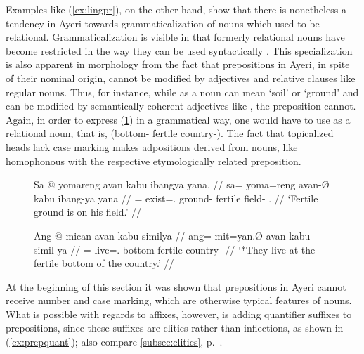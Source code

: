 Examples like (\ref{ex:lingpr}), on the other hand, show that there is
nonetheless a tendency in Ayeri towards grammaticalization of nouns which used
to be relational. Grammaticalization is visible in that formerly relational
nouns have become restricted in the way they can be used syntactically
\citep[174]{lehmann2015}. This specialization is also apparent in morphology
from the fact that prepositions in Ayeri, in spite of their nominal origin,
cannot be modified by adjectives and relative clauses like regular nouns. Thus,
for instance, while  as a noun can mean `soil' or `ground' and
can be modified by semantically coherent adjectives like
, the preposition  cannot. Again, in
order to express (\ref{ex:avanprep}) in a grammatical way, one would have to
use  as a relational noun, that is, 
(bottom-\Loc{} fertile country-\Gen{}). The fact that topicalized heads lack
case marking makes adpositions derived from nouns, like 
homophonous with the respective etymologically related preposition.

\begin{figure}[h]
\pex
\a\label{ex:avannn}\begingl
	\gla Sa @ yomareng avan kabu ibangya yana. //
	\glb sa= yoma=reng avan-Ø kabu ibang-ya yana //
	\glc \PatT{}= exist=\TsgI.\AargI{} ground-\Top{} fertile field-\Loc{} 
		\TsgM{}.\Gen{} //
	\glft `Fertile ground is on his field.' //
\endgl

\a\label{ex:avanprep}\ljudge* \begingl
	\gla Ang @ mican avan kabu similya //
	\glb ang= mit=yan.Ø avan kabu simil-ya //
	\glc \AgtT{}= live=\TplM{}.\Top{} bottom fertile country-\Loc{} //
	\glft `*They live at the fertile bottom of the country.' //
\endgl
\xe
\end{figure}

At the beginning of this section it was shown that prepositions in Ayeri cannot
receive number and case marking, which are otherwise typical features of nouns.
What is possible with regards to affixes, however, is adding quantifier
suffixes to prepositions, since these suffixes are clitics rather than
inflections, as shown in (\ref{ex:prepquant}); also compare
\autoref{subsec:clitics}, p.~\pageref{clitics_quant}.

